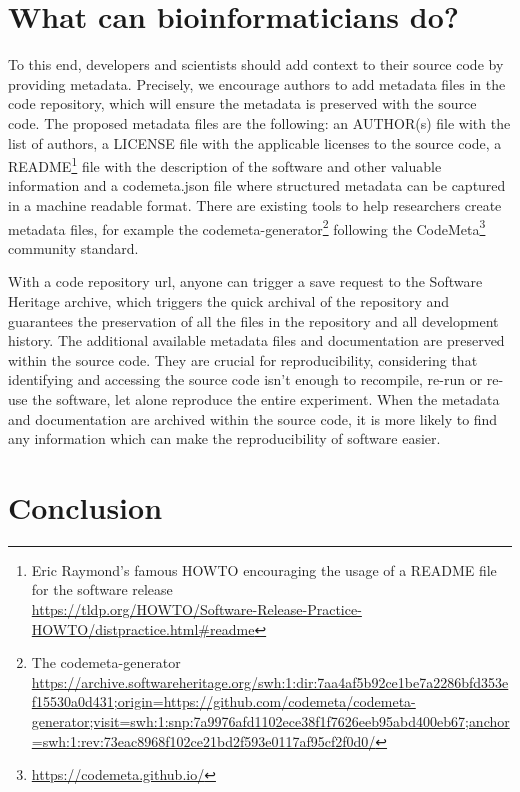 \documentclass[long, final]{jobim}
\begin{document}
\section{What can bioinformaticians do?}

To this end, developers and scientists should add context to their source code by providing metadata. Precisely, we encourage authors to add metadata files in the code repository, which will ensure the metadata is preserved with the source code. The proposed metadata files are the following: an AUTHOR(s) file with the list of authors, a LICENSE file with the applicable licenses to the source code, a README\footnote{Eric Raymond's famous HOWTO encouraging the usage of a README file for the software release\\ 
\url{ https://tldp.org/HOWTO/Software-Release-Practice-HOWTO/distpractice.html\#readme}} file with the description of the software and other valuable information and a codemeta.json file where structured metadata can be captured in a machine readable format. There are existing tools to help researchers create metadata files, for example the codemeta-generator\footnote{The codemeta-generator \url{ https://archive.softwareheritage.org/swh:1:dir:7aa4af5b92ce1be7a2286bfd353ef15530a0d431;origin=https://github.com/codemeta/codemeta-generator;visit=swh:1:snp:7a9976afd1102ece38f1f7626eeb95abd400eb67;anchor=swh:1:rev:73eac8968f102ce21bd2f593e0117af95cf2f0d0/}} following the CodeMeta\footnote{\url{https://codemeta.github.io/}} community standard. 

With a code repository url, anyone can trigger a save request to the Software Heritage archive, which triggers the quick archival of the repository and guarantees the preservation of all the files in the repository and all development history. The additional available metadata files and documentation are preserved within the source code. They are crucial for reproducibility, considering that identifying and accessing the source code isn’t enough to recompile, re-run or re-use the software, let alone reproduce the entire experiment. When the metadata and documentation are archived within the source code, it is more likely to find any information which can make the reproducibility of software easier.


\section{Conclusion}
\end{document}

